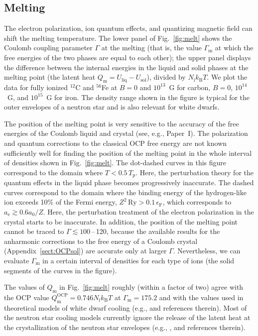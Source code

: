 \documentclass[traditabstract]{aa}
\newcommand{\ael}{a_\mathrm{e}}
\newcommand{\Gammam}{\Gamma_\mathrm{m}}
\newcommand{\EF}{\epsilon_\mathrm{F}}
\newcommand{\Nion}{N_\mathrm{i}}
\newcommand{\kB}{k_\mathrm{B}}
\newcommand{\Tp}{T_\mathrm{p}}
\begin{document}
\subsection{Melting}

The electron polarization, ion quantum effects, and 
quantizing magnetic field can shift the melting temperature.
The lower panel of Fig.~\ref{fig:melt} shows the Coulomb
coupling parameter $\Gamma$ at the melting (that is, the
value $\Gammam$ at which the free energies of the two phases
are equal to each other); the upper panel displays the
difference between the internal energies in the liquid and
solid phases at the melting point (the latent heat
$Q_\mathrm{m}=U_\mathrm{liq}-U_\mathrm{sol}$), divided by
$\Nion\kB T$. We plot the data for fully ionized $^{12}$C
and $^{56}$Fe at $B=0$ and $10^{13}$~G for carbon, $B=0$,
$10^{14}$~G, and $10^{15}$~G for iron. The density range
shown in the figure is typical for the outer envelopes of a
neutron star and is also relevant for white dwarfs.

The position of the melting point is very sensitive to the
accuracy of the free energies of the Coulomb liquid and
crystal (see, e.g., Paper~I). The polarization and
quantum corrections to the classical OCP free energy are not
known sufficiently well for finding the position of the
melting point in the whole interval of densities shown in
Fig.~\ref{fig:melt}. The dot-dashed curves in this figure
correspond to the domain where $T < 0.5\,\Tp$.
Here, the perturbation theory for the quantum effects in the
liquid phase becomes progressively inaccurate. The dashed
curves correspond to the domain where the binding energy of
the hydrogen-like ion exceeds 10\% of the Fermi energy,
$Z^2\,\textrm{Ry} > 0.1\, \EF$, which corresponds to 
$\ael\gtrsim0.6a_0/Z$. Here, the perturbation treatment of
the electron polarization in the crystal starts to be
inaccurate. In addition, the position of the melting point
cannot be traced to $\Gamma\lesssim100$\,--\,120, because
the available results for the anharmonic corrections to the
free energy of a Coulomb crystal
(Appendix~\ref{sect:OCPsol}) are
accurate only at larger $\Gamma$.
Nevertheless, we can evaluate $\Gammam$ in a certain
interval of densities for each type of ions (the solid
segments of the curves in the figure).

The values of $Q_\mathrm{m}$ in Fig.~\ref{fig:melt} roughly
(within a factor of two) agree with the OCP value
$Q_\mathrm{m}^\mathrm{OCP}=0.746\Nion\kB T$ at
$\Gammam=175.2$ and with the values used in theoretical
models of white dwarf cooling (e.g., \citealp{Hansen04} and
references therein). Most of the neutron star cooling models
currently ignore the release of the latent heat at the
crystallization of the neutron star envelopes (e.g.,
\citealp{YakovlevPethick}, and references therein).
\end{document}

